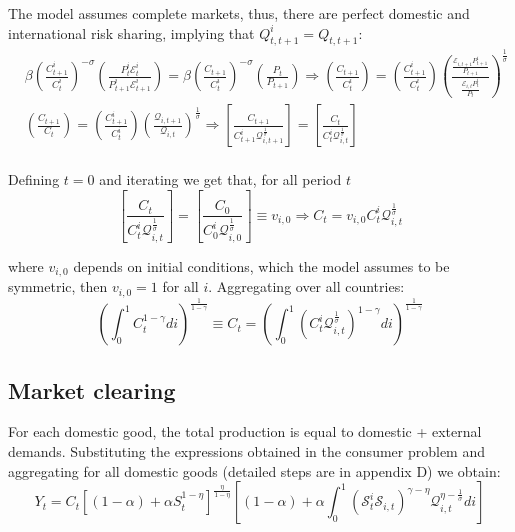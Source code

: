 \documentclass{article}
\newcommand{\E}{\mathcal{E}}
\begin{document}
The model assumes complete markets, thus, there are perfect domestic and international risk sharing, implying that $Q^i_{t, t+1} = Q_{t,t+1}$:
\begin{equation}
\begin{array}{cc}
     &\displaystyle \beta \left( \frac{C^i_{t+1}}{C_t^i} \right)^{-\sigma} \left( \frac{P_t^i \E^i_t}{P^i_{t+1} \E^i_{t+1}} \right) = \beta \left( \frac{C_{t+1}}{C_t^i} \right)^{-\sigma} \left( \frac{P_t}{P_{t+1}} \right) \Rightarrow \left( \frac{C_{t+1}}{C_t^i} \right) = \left( \frac{C^i_{t+1}}{C_t^i} \right) \left(\frac{\frac{\E_{i,t+1} P^i_{t+1}}{P_{t+1}}}{\frac{\E_{i,t} P^i_{t}}{P_{t}}} \right)^{\frac{1}{\sigma}} \\
     & \displaystyle \left( \frac{C_{t+1}}{C_t} \right) = \left( \frac{C^i_{t+1}}{C_t^i} \right) \left(\frac{\mathcal{Q}_{i,t+1}}{\mathcal{Q}_{i,t}} \right)^{\frac{1}{\sigma}} \Rightarrow \left[\frac{C_{t+1}}{C^i_{t+1} \mathcal Q_{i,t+1}^{\frac{1}{\sigma}}}\right] =  \left[\frac{C_t}{C^i_t \mathcal Q_{i,t}^{\frac{1}{\sigma}}} \right] \\
\end{array}
\end{equation}

Defining $t = 0$ and iterating we get that, for all period $t$
\begin{equation}
    \label{riskSharing}
    \left[\frac{C_{t}}{C^i_{t} \mathcal Q_{i,t}^{\frac{1}{\sigma}}}\right] =  \left[\frac{C_0}{C^i_0 \mathcal Q_{i,0}^{\frac{1}{\sigma}}} \right] \equiv v_{i, 0} \Rightarrow C_t = v_{i,0} C^i_t \mathcal Q_{i,t}^{\frac{1}{\sigma}}
\end{equation}

where $v_{i,0}$ depends on initial conditions, which the model assumes to be symmetric, then $v_{i,0} = 1$ for all $i$. Aggregating over all countries:
\begin{equation}
    \label{consumption}
    \left(\int^1_0 C_t^{1-\gamma} di \right)^{\frac{1}{1-\gamma}} \equiv C_t = \left(\int^1_0  \left(C_t^i \mathcal Q_{i,t}^{\frac{1}{\sigma}}\right)^{1-\gamma} di \right)^{\frac{1}{1-\gamma}}
\end{equation}

\subsection{Market clearing}
For each domestic good, the total production is equal to domestic + external demands. Substituting the expressions obtained in the consumer problem and aggregating for all domestic goods (detailed steps are in appendix D) we obtain:
\begin{equation}
    \label{output_st}
    Y_{t} = C_t \left[(1-\alpha) + \alpha S_t^{1-\eta} \right]^{\frac{\eta}{1-\eta}} \left[(1-\alpha)  +  \alpha \int_0^1 \left(\mathcal S^i_t \mathcal S_{i,t} \right)^{\gamma - \eta} \mathcal Q^{\eta - \frac{1}{\sigma}}_{i,t} di \right] 
\end{equation}
\end{document}
